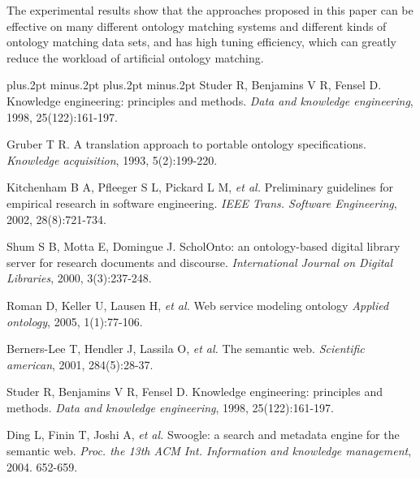 \documentclass[twoside]{article}
\begin{document}
The experimental results show that the approaches proposed in this paper can be effective on many different ontology matching systems and different kinds of ontology matching data sets, and has high tuning efficiency, which can greatly reduce the workload of artificial ontology matching.

\vspace{2mm}

\begin{thebibliography}{99}
\footnotesize
\itemsep=-3pt plus.2pt minus.2pt
\baselineskip=13pt plus.2pt minus.2pt
Studer R, Benjamins V R, Fensel D. Knowledge engineering: principles and methods. {\it Data and knowledge engineering}, 1998, 25(122):161-197.

Gruber T R. A translation approach to portable ontology specifications. {\it Knowledge acquisition}, 1993, 5(2):199-220.

Kitchenham B A, Pfleeger S L, Pickard L M, {\it et al.} Preliminary guidelines for empirical research in software engineering. {\it IEEE Trans. Software Engineering}, 2002, 28(8):721-734.

Shum S B, Motta E, Domingue J. ScholOnto: an ontology-based digital library server for research documents and discourse. {\it International Journal on Digital Libraries}, 2000, 3(3):237-248.

Roman D, Keller U, Lausen H, {\it et al.} Web service modeling ontology {\it Applied ontology}, 2005, 1(1):77-106.

Berners-Lee T, Hendler J, Lassila O, {\it et al.} The semantic web. {\it Scientific american}, 2001, 284(5):28-37.

Studer R, Benjamins V R, Fensel D. Knowledge engineering: principles and methods. {\it Data and knowledge engineering}, 1998, 25(122):161-197.

Ding L, Finin T, Joshi A, {\it et al.} Swoogle: a search and metadata engine for the semantic web. {\it Proc. the 13th ACM Int. Information and knowledge management}, 2004. 652-659.


\end{thebibliography}
\end{document}
